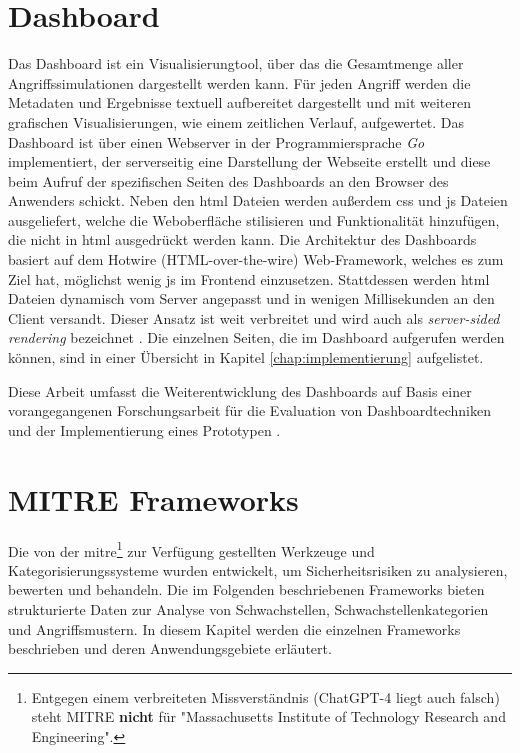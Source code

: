 \section{Dashboard}
\label{sec:tech-dashboard}
Das Dashboard ist ein Visualisierungtool, über das die Gesamtmenge aller Angriffssimulationen dargestellt werden kann. Für jeden Angriff werden die Metadaten und Ergebnisse textuell aufbereitet dargestellt und mit weiteren grafischen Visualisierungen, wie einem zeitlichen Verlauf, aufgewertet.
Das Dashboard ist über einen Webserver in der Programmiersprache \textit{Go} implementiert, der serverseitig eine Darstellung der Webseite erstellt und diese beim Aufruf der spezifischen Seiten des Dashboards an den Browser des Anwenders schickt. Neben den \gls{html} Dateien werden außerdem \gls{css} und \gls{js} Dateien ausgeliefert, welche die Weboberfläche stilisieren und Funktionalität hinzufügen, die nicht in \gls{html} ausgedrückt werden kann. Die Architektur des Dashboards basiert auf dem Hotwire (HTML-over-the-wire) Web-Framework, welches es zum Ziel hat, möglichst wenig \gls{js} im Frontend einzusetzen. Stattdessen werden \gls{html} Dateien dynamisch vom Server angepasst und in wenigen Millisekunden an den Client versandt. Dieser Ansatz ist weit verbreitet und wird auch als \textit{server-sided rendering} bezeichnet \autocite{HTMLWireHotwire}. Die einzelnen Seiten, die im Dashboard aufgerufen werden können, sind in einer Übersicht in Kapitel \ref{chap:implementierung} aufgelistet.
\par Diese Arbeit umfasst die Weiterentwicklung des Dashboards auf Basis einer vorangegangenen Forschungsarbeit für die Evaluation von Dashboardtechniken und der Implementierung eines Prototypen \autocite{weberEvaluationDashboardTechniques}.

\label{bg:mitre-frameworks}
\section{MITRE Frameworks}
Die von der \gls{mitre}\footnote{Entgegen einem verbreiteten Missverständnis (ChatGPT-4 liegt auch falsch) steht MITRE \textbf{nicht} für "Massachusetts Institute of Technology Research and Engineering".} zur Verfügung gestellten Werkzeuge und Kategorisierungssysteme wurden entwickelt, um Sicherheitsrisiken zu analysieren, bewerten und behandeln. Die im Folgenden beschriebenen Frameworks bieten strukturierte Daten zur Analyse von Schwachstellen, Schwachstellenkategorien und Angriffsmustern. In diesem Kapitel werden die einzelnen Frameworks beschrieben und deren Anwendungsgebiete erläutert.

